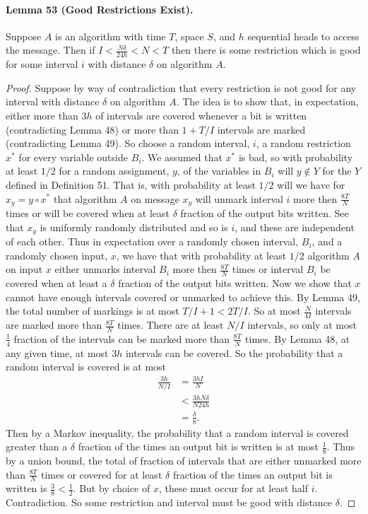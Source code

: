 \documentclass[10pt,a4paper]{article}
\begin{document}
\paragraph{Lemma 53 (Good Restrictions Exist).} Suppose $A$ is an algorithm with time $T$, space $S$, and $h$ sequential heads to access the message.
Then if $I<\frac{N\delta}{24h}<N<T$ then there is some restriction which is good for some interval $i$ with distance $\delta$ on algorithm $A$.
\begin{proof}
Suppose by way of contradiction that every restriction is not good for any interval with distance $\delta$ on algorithm $A$. The idea is to show that, in expectation, either more than $3h$ of intervals are covered whenever a bit is written (contradicting Lemma 48) or more than $1+T/I$ intervals are marked (contradicting Lemma 49).
So choose a random interval, $i$, a random restriction $x^*$ for every variable outside $B_i$. We assumed that $x^*$ is bad, so with probability at least $1/2$ for a random assignment, $y$, of the variables in $B_i$ will $y\notin Y$ for the $Y$ defined in Definition 51. That is, with probability at least $1/2$ will we have for $x_y=y\circ x^*$ that algorithm $A$ on message $x_y$ will unmark interval $i$ more then $\frac{8T}N$ times or will be covered when at least $\delta$ fraction of the output bits written.
See that $x_y$ is uniformly randomly distributed and so is $i$, and these are independent of each other. Thus in expectation over a randomly chosen interval, $B_i$, and a randomly chosen input, $x$, we have that with probability at least $1/2$ algorithm $A$ on input $x$ either unmarks interval $B_i$ more then $\frac{8T}N$ times or interval $B_i$ be covered when at least a $\delta$ fraction of the output bits written. Now we show that $x$ cannot have enough intervals covered or unmarked to achieve this.
By Lemma 49, the total number of markings is at most $T/I+1<2T/I$. So at most $\frac N{4I}$ intervals are marked more than $\frac{8T}N$ times. There are at least $N/I$ intervals, so only at most $\frac14$ fraction of the intervals can be marked more than $\frac{8T}N$ times.
By Lemma 48, at any given time, at most $3h$ intervals can be covered. So the probability that a random interval is covered is at most
\begin{align*}\frac{3h}{N/I}&=\frac{3hI}N\\&<\frac{3hN\delta}{N24h}\\&=\frac\delta8.\end{align*}
Then by a Markov inequality, the probability that a random interval is covered greater than a $\delta$ fraction of the times an output bit is written is at most $\frac18$.
Thus by a union bound, the total of fraction of intervals that are either unmarked more than $\frac{8T}N$ times or covered for at least $\delta$ fraction of the times an output bit is written is $\frac38<\frac12$. But by choice of $x$, these must occur for at least half $i$. Contradiction. So some restriction and interval must be good with distance $\delta$.
\end{proof}
\end{document}
